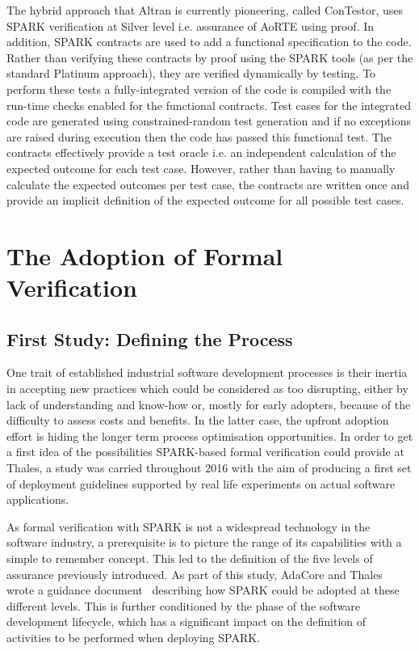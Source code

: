 \documentclass{llncs}
\begin{document}
The hybrid approach that Altran is currently pioneering, called ConTestor, uses
SPARK verification at Silver level i.e. assurance of AoRTE using proof. In
addition, SPARK contracts are used to add a functional specification to the
code. Rather than verifying these contracts by proof using the SPARK tools (as
per the standard Platinum approach), they are verified dynamically by
testing. To perform these tests a fully-integrated version of the code is
compiled with the run-time checks enabled for the functional contracts. Test
cases for the integrated code are generated using constrained-random test
generation and if no exceptions are raised during execution then the code has
passed this functional test. The contracts effectively provide a test oracle
i.e. an independent calculation of the expected outcome for each test
case. However, rather than having to manually calculate the expected outcomes
per test case, the contracts are written once and provide an implicit
definition of the expected outcome for all possible test cases.

\section{The Adoption of Formal Verification}

\subsection{First Study: Defining the Process}

One trait of established industrial software development processes is their
inertia in accepting new practices which could be considered as too disrupting,
either by lack of understanding and know-how or, mostly for early adopters,
because of the difficulty to assess costs and benefits. In the latter case, the
upfront adoption effort is hiding the longer term process optimisation
opportunities. In order to get a first idea of the possibilities SPARK-based
formal verification could provide at Thales, a study was carried throughout
2016 with the aim of producing a first set of deployment guidelines supported
by real life experiments on actual software applications.

As formal verification with SPARK is not a widespread technology in the
software industry, a prerequisite is to picture the range of its capabilities
with a simple to remember concept. This led to the definition of the five
levels of assurance previously introduced. As part of this study, AdaCore and
Thales wrote a guidance document~\cite{AdaCoreThalesSPARK} describing how SPARK
could be adopted at these different levels. This is further conditioned by the
phase of the software development lifecycle, which has a significant impact on
the definition of activities to be performed when deploying SPARK.
\end{document}
